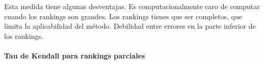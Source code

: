  Esta medida tiene algunas desventajas. Es computacionalmente caro de computar cuando los rankings son grandes. Los rankings tienes que ser completos, que limita la aplicabilidad del método. Debilidad entre errores en la parte inferior de los rankings.
 
 \paragraph{Tau de Kendall para rankings parciales}